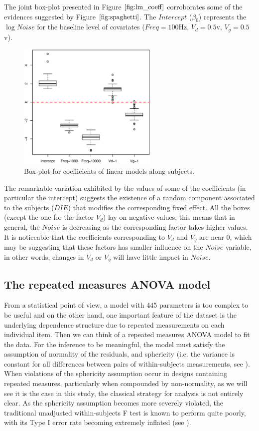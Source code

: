 \documentclass[sn-mathphys]{sn-jnl}%
\theoremstyle{thmstyleone}%
\theoremstyle{thmstyletwo}%
\theoremstyle{thmstylethree}%
\begin{document}
The joint box-plot presented in Figure $\ref{fig:lm_coeff}$ corroborates some of the evidences suggested by Figure $\ref{fig:spaghetti}$. 
The $Intercept$ ($\beta_0$) represents the $\log Noise$ for the baseline level of covariates ($Freq=100$Hz, $V_d=0.5$v, $V_g=0.5$v).
\begin{figure}[ht]
	\centerline{
		\includegraphics[width=0.6\textwidth]{Fig4_lm_coeff.eps}}
	\caption{Box-plot for coefficients of linear models along subjects.}
	\label{fig:lm_coeff}
\end{figure}

The remarkable variation exhibited by the values of some of the coefficients (in particular the intercept) suggests the existence of a random component associated to the subjects ($DIE$) that modifies the corresponding fixed effect. 
All the boxes (except the one for the factor $V_d$) lay on negative values, this means that in general, the $Noise$ is decreasing as the corresponding factor takes higher values. 
It is noticeable that the coefficients corresponding to $V_d$ and $V_g$ are near 0, which may be suggesting that these factors has smaller influence on the $Noise$ variable, in other words, changes in $V_d$ or $V_g$ will have little impact in $Noise$.




%
\subsection{The repeated measures ANOVA model} \label{sec:anovaCheck}
\noindent From a statistical point of view, a model with 445 parameters is too complex to be useful and on the other hand, one important feature of the dataset is the underlying dependence structure  due to repeated measurements on each individual item. Then we can think of a repeated measures ANOVA model to fit the data. For the inference to be meaningful, the model must satisfy the assumption of normality of the residuals, and sphericity (i.e. the variance is constant for all differences between pairs of within-subjects measurements, see \cite{BHN2000}). When violations of the sphericity assumption occur in designs containing repeated measures, particularly when compounded by non-normality, as we will see it is the case in this study, the classical strategy for analysis is not entirely clear. As the sphericity assumption becomes more severely violated, the traditional unadjusted within-subjects F test is known to perform quite poorly, with its Type I error rate becoming extremely inflated (see \cite{BHN2000}).
\end{document}
